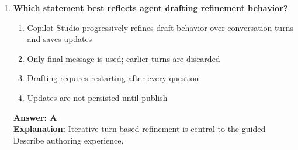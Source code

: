 \documentclass[10pt]{article}
\begin{document}
\begin{enumerate}[leftmargin=*]
\item \textbf{Which statement best reflects agent drafting refinement behavior?}
\begin{enumerate}[label=\Alph*.]
  \item Copilot Studio progressively refines draft behavior over conversation turns and saves updates
  \item Only final message is used; earlier turns are discarded
  \item Drafting requires restarting after every question
  \item Updates are not persisted until publish
\end{enumerate}
\textbf{Answer: A}\\
\textbf{Explanation:} Iterative turn-based refinement is central to the guided Describe authoring experience.

\end{enumerate}


\clearpage
\end{document}

